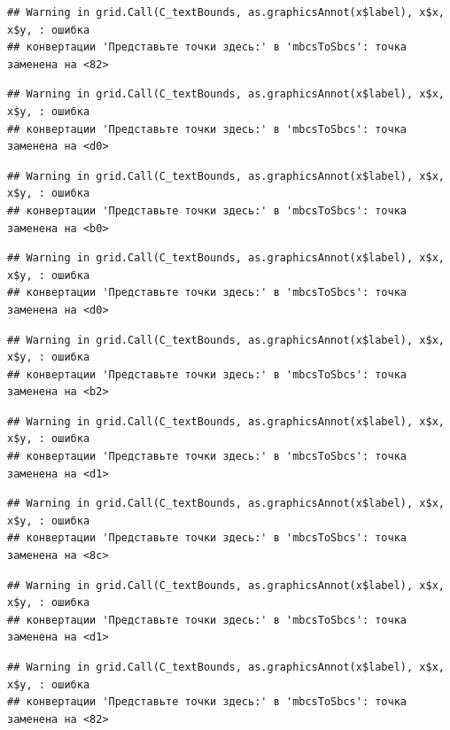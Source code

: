 \documentclass[]{book}
\begin{document}
\begin{verbatim}
## Warning in grid.Call(C_textBounds, as.graphicsAnnot(x$label), x$x, x$y, : ошибка
## конвертации 'Представьте точки здесь:' в 'mbcsToSbcs': точка заменена на <82>
\end{verbatim}

\begin{verbatim}
## Warning in grid.Call(C_textBounds, as.graphicsAnnot(x$label), x$x, x$y, : ошибка
## конвертации 'Представьте точки здесь:' в 'mbcsToSbcs': точка заменена на <d0>
\end{verbatim}

\begin{verbatim}
## Warning in grid.Call(C_textBounds, as.graphicsAnnot(x$label), x$x, x$y, : ошибка
## конвертации 'Представьте точки здесь:' в 'mbcsToSbcs': точка заменена на <b0>
\end{verbatim}

\begin{verbatim}
## Warning in grid.Call(C_textBounds, as.graphicsAnnot(x$label), x$x, x$y, : ошибка
## конвертации 'Представьте точки здесь:' в 'mbcsToSbcs': точка заменена на <d0>
\end{verbatim}

\begin{verbatim}
## Warning in grid.Call(C_textBounds, as.graphicsAnnot(x$label), x$x, x$y, : ошибка
## конвертации 'Представьте точки здесь:' в 'mbcsToSbcs': точка заменена на <b2>
\end{verbatim}

\begin{verbatim}
## Warning in grid.Call(C_textBounds, as.graphicsAnnot(x$label), x$x, x$y, : ошибка
## конвертации 'Представьте точки здесь:' в 'mbcsToSbcs': точка заменена на <d1>
\end{verbatim}

\begin{verbatim}
## Warning in grid.Call(C_textBounds, as.graphicsAnnot(x$label), x$x, x$y, : ошибка
## конвертации 'Представьте точки здесь:' в 'mbcsToSbcs': точка заменена на <8c>
\end{verbatim}

\begin{verbatim}
## Warning in grid.Call(C_textBounds, as.graphicsAnnot(x$label), x$x, x$y, : ошибка
## конвертации 'Представьте точки здесь:' в 'mbcsToSbcs': точка заменена на <d1>
\end{verbatim}

\begin{verbatim}
## Warning in grid.Call(C_textBounds, as.graphicsAnnot(x$label), x$x, x$y, : ошибка
## конвертации 'Представьте точки здесь:' в 'mbcsToSbcs': точка заменена на <82>
\end{verbatim}
\end{document}
